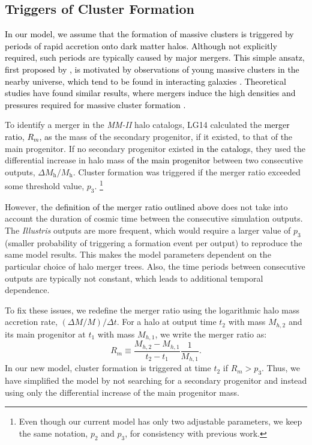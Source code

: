 \documentclass[fleqn,usenatbib]{mnras}
\newcommand{\revv}[1]{\textcolor{black}{#1}}
\newcommand{\rev}[1]{\textcolor{black}{#1}}
\newcommand{\Mh}{M_{\mathrm{h}}}
\begin{document}
\subsection{Triggers of Cluster Formation}
\label{sec:cluster_formation}

\revv{In our model, we assume that the formation of massive clusters is triggered by periods of rapid accretion onto dark matter halos. Although not explicitly required, such periods are typically caused by major mergers. This simple ansatz, first proposed by \cite{ashman_zepf92}, is motivated by observations of young massive clusters in the nearby universe, which tend to be found in interacting galaxies \citep[e.g.,][]{wilson_etal_2006, portegies_zwart_etal10}. Theoretical studies have found similar results, where mergers induce the high densities and pressures required for massive cluster formation \citep{bournaud_etal08, murray_etal10,kruijssen2015,li_etal17, el-badry_etal_2018}.}

To identify a merger in the \textit{MM-II} halo catalogs, LG14 calculated the \rev{merger ratio, $R_m$, as} the mass of the secondary progenitor, if it existed, to that of the main progenitor. If no secondary progenitor existed \rev{in the catalogs}, they used the differential increase in halo mass \rev{of the main progenitor} between two consecutive outputs, $\Delta \Mh / \Mh$. Cluster formation was triggered if the merger ratio exceeded some threshold value, $p_3$.
\footnote{Even though our current model has only two adjustable parameters, we keep the same notation, $p_2$ and $p_3$, for consistency with previous work.} 

However, the \rev{definition of the merger ratio outlined above} does not take into account the duration of cosmic time between the consecutive simulation outputs. The \textit{Illustris} outputs are more frequent, which would require a larger value of $p_3$ (smaller probability of triggering a formation event per output) to reproduce the same model results. This makes the model parameters dependent on the particular choice of halo merger trees. Also, the time periods between consecutive outputs are typically not constant, which leads to additional temporal dependence.

To fix these issues, we redefine the merger ratio using the logarithmic halo mass accretion rate, $(\Delta M/M)/\Delta t$. For a halo at output time $t_2$ with mass $M_{h,2}$ and its main progenitor at $t_1$ with mass $M_{h,1}$, we write the merger ratio as:
\begin{equation}
  R_m \equiv \frac{M_{h,2} - M_{h,1}}{t_2 - t_1} \frac{1}{M_{h,1}}.
\end{equation}
In our new model, cluster formation is triggered at time $t_2$ if $R_m > p_3$. Thus, we have simplified the model by not searching for a secondary progenitor and instead using only the differential increase of the main progenitor mass.
\end{document}
